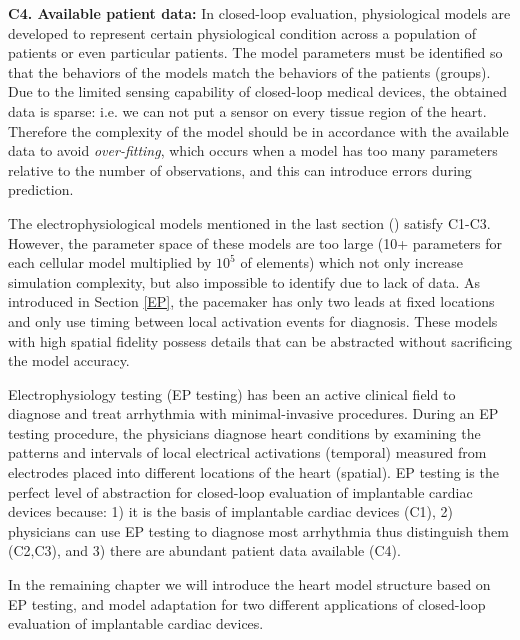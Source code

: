\textbf{C4. Available patient data: } In closed-loop evaluation, physiological models are developed to represent certain physiological condition across a population of patients or even particular patients. 
The model parameters must be identified so that the behaviors of the models match the behaviors of the patients (groups).  Due to the limited sensing capability of closed-loop medical devices, the obtained data is sparse: i.e. we can not put a sensor on every tissue region of the heart. 
Therefore the complexity of the model should be in accordance with the available data to avoid \emph{over-fitting}, which occurs when a model has too many parameters relative to the number of observations, and this can introduce errors during prediction. 

The electrophysiological models mentioned in the last section (\cite{natalia,Grosu_MHA}) satisfy C1-C3. 
However, the parameter space of these models are too large (10+ parameters for each cellular model multiplied by $10^5$ of elements) which not only increase simulation complexity, but also impossible to identify due to lack of data. 
As introduced in Section \ref{EP}, the pacemaker has only two leads at fixed locations and only use timing between local activation events for diagnosis. 
These models with high spatial fidelity possess details that can be abstracted without sacrificing the model accuracy.

Electrophysiology testing (EP testing) has been an active clinical field to diagnose and treat arrhythmia with minimal-invasive procedures. 
During an EP testing procedure, the physicians diagnose heart conditions by examining the patterns and intervals of local electrical activations (temporal) measured from electrodes placed into different locations of the heart (spatial). 
EP testing is the perfect level of abstraction for closed-loop evaluation of implantable cardiac devices because: 1) it is the basis of implantable cardiac devices (C1), 2) physicians can use EP testing to diagnose most arrhythmia thus distinguish them (C2,C3), and 3) there are abundant patient data available (C4). 

In the remaining chapter we will introduce the heart model structure based on EP testing, and model adaptation for two different applications of closed-loop evaluation of implantable cardiac devices.



